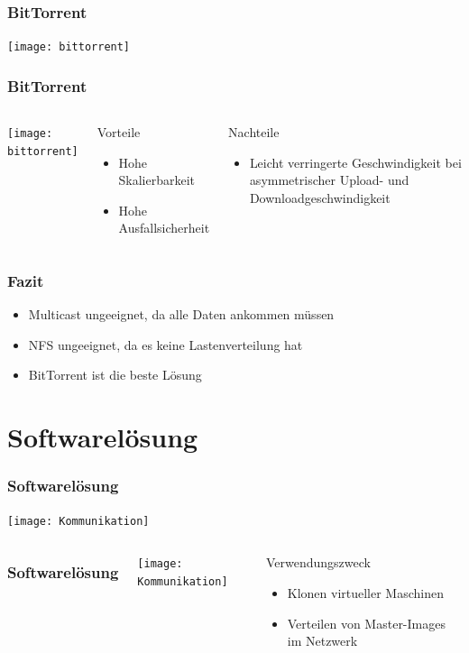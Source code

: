 \documentclass{beamer}
\begin{document}
\begin{frame}
\frametitle{BitTorrent} 
\texttt{[image: bittorrent]}
\end{frame}

\begin{frame}
\frametitle{BitTorrent} 
\begin{columns}
\column{3.8cm} 
\texttt{[image: bittorrent]}
\column{6cm} 
\begin{block}{Vorteile}
\begin{itemize}
 \item Hohe Skalierbarkeit \pause 
 \item Hohe Ausfallsicherheit \pause
\end{itemize}
\end{block}

\begin{alertblock}{Nachteile}
\begin{itemize}
  \item Leicht verringerte Geschwindigkeit bei asymmetrischer Upload- und Downloadgeschwindigkeit
\end{itemize}
\end{alertblock}
\end{columns}
\end{frame}

\begin{frame}
\frametitle{Fazit} 
\fontsize{20pt}{25pt} \selectfont
\begin{itemize}
  \item Multicast ungeeignet, da alle Daten ankommen müssen \pause
  \item NFS ungeeignet, da es keine Lastenverteilung hat \pause
  \item BitTorrent ist die beste Lösung
\end{itemize}
\end{frame}


\section{Softwarelösung}

\begin{frame}
\frametitle{Softwarelösung} 
\texttt{[image: Kommunikation]}

\end{frame}

\begin{frame}
\begin{columns}
\column{3.8cm} 
\frametitle{Softwarelösung} 
\texttt{[image: Kommunikation]}
\column{6cm} 
\begin{block}{Verwendungszweck}
\begin{itemize}
 \item Klonen virtueller Maschinen \pause
 \item Verteilen von Master-Images im Netzwerk
\end{itemize}
\end{block}
\end{columns}
\end{frame}
\end{document}
